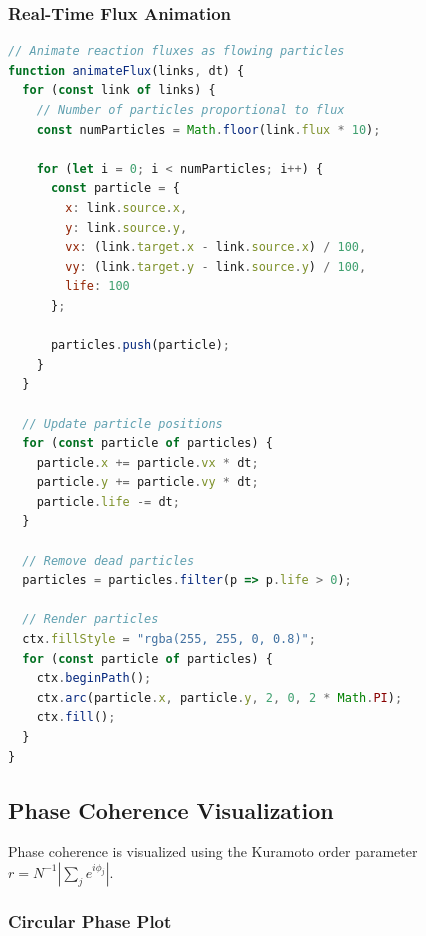 \documentclass[12pt,a4paper]{article}
\begin{document}
\subsubsection{Real-Time Flux Animation}

\begin{lstlisting}[language=JavaScript, basicstyle=\ttfamily\small]
// Animate reaction fluxes as flowing particles
function animateFlux(links, dt) {
  for (const link of links) {
    // Number of particles proportional to flux
    const numParticles = Math.floor(link.flux * 10);
    
    for (let i = 0; i < numParticles; i++) {
      const particle = {
        x: link.source.x,
        y: link.source.y,
        vx: (link.target.x - link.source.x) / 100,
        vy: (link.target.y - link.source.y) / 100,
        life: 100
      };
      
      particles.push(particle);
    }
  }
  
  // Update particle positions
  for (const particle of particles) {
    particle.x += particle.vx * dt;
    particle.y += particle.vy * dt;
    particle.life -= dt;
  }
  
  // Remove dead particles
  particles = particles.filter(p => p.life > 0);
  
  // Render particles
  ctx.fillStyle = "rgba(255, 255, 0, 0.8)";
  for (const particle of particles) {
    ctx.beginPath();
    ctx.arc(particle.x, particle.y, 2, 0, 2 * Math.PI);
    ctx.fill();
  }
}
\end{lstlisting}

\subsection{Phase Coherence Visualization}

Phase coherence is visualized using the Kuramoto order parameter $r = N^{-1}|\sum_j e^{i\phi_j}|$.

\subsubsection{Circular Phase Plot}
\end{document}
